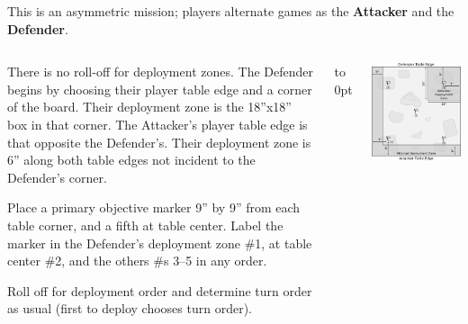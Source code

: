 

This is an asymmetric mission; players alternate games as the
\textbf{Attacker} and the \textbf{Defender}.

  \begin{columns}
\begin{tablesetup}    
  There is no roll-off for deployment zones.  The Defender begins by
  choosing their player table edge and a corner of the board.  Their
  deployment zone is the 18''x18'' box in that corner.  The Attacker's
  player table edge is that opposite the Defender's.  Their deployment
  zone is 6'' along both table edges not incident to the Defender's
  corner.

  Place a primary objective marker 9'' by 9'' from each table corner,
  and a fifth at table center.  Label the marker in the Defender's
  deployment zone \#1, at table center \#2, and the others \#s 3--5 in
  any order.

  Roll off for deployment order and determine turn order as usual
  (first to deploy chooses turn order).
\end{tablesetup}

\vspace{1.5em}
\vspace{-0.5em}
\nightfighting

\vfill\vbox to 0pt{}
\columnbreak
\bigskip\centerline{\includegraphics[width=\linewidth]{maps/mission2.pdf}}
  \end{columns}

